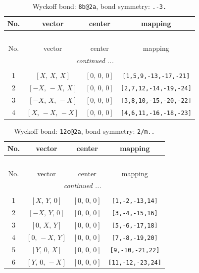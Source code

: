 \documentclass[fleqn,8pt]{jsarticle}
\begin{document}
\begin{longtable}{cccc}
\caption{Wyckoff bond: {\tt 8b@2a}, bond symmetry: {\tt .-3.}}
 \\
 \hline \hline
No. & vector & center & mapping \\ \hline \endfirsthead

\multicolumn{3}{l}{\tablename\ \thetable{}} \\
 \hline \hline
No. & vector & center & mapping \\ \hline \endhead

 \hline \hline
\multicolumn{3}{r}{\footnotesize\it continued ...} \\ \endfoot

 \hline \hline
\multicolumn{3}{r}{} \\ \endlastfoot

1 & $\left[ X,\, X,\, X \right]$ & $\left[ 0,\, 0,\, 0 \right]$ & {\tt [1,5,9,-13,-17,-21]} \\ \hline
2 & $\left[ - X,\, - X,\, X \right]$ & $\left[ 0,\, 0,\, 0 \right]$ & {\tt [2,7,12,-14,-19,-24]} \\ \hline
3 & $\left[ - X,\, X,\, - X \right]$ & $\left[ 0,\, 0,\, 0 \right]$ & {\tt [3,8,10,-15,-20,-22]} \\ \hline
4 & $\left[ X,\, - X,\, - X \right]$ & $\left[ 0,\, 0,\, 0 \right]$ & {\tt [4,6,11,-16,-18,-23]} \\
\end{longtable}
\renewcommand{\arraystretch}{1.2}
\begin{longtable}{cccc}
\caption{Wyckoff bond: {\tt 12c@2a}, bond symmetry: {\tt 2/m..}}
 \\
 \hline \hline
No. & vector & center & mapping \\ \hline \endfirsthead

\multicolumn{3}{l}{\tablename\ \thetable{}} \\
 \hline \hline
No. & vector & center & mapping \\ \hline \endhead

 \hline \hline
\multicolumn{3}{r}{\footnotesize\it continued ...} \\ \endfoot

 \hline \hline
\multicolumn{3}{r}{} \\ \endlastfoot

1 & $\left[ X,\, Y,\, 0 \right]$ & $\left[ 0,\, 0,\, 0 \right]$ & {\tt [1,-2,-13,14]} \\ \hline
2 & $\left[ - X,\, Y,\, 0 \right]$ & $\left[ 0,\, 0,\, 0 \right]$ & {\tt [3,-4,-15,16]} \\ \hline
3 & $\left[ 0,\, X,\, Y \right]$ & $\left[ 0,\, 0,\, 0 \right]$ & {\tt [5,-6,-17,18]} \\ \hline
4 & $\left[ 0,\, - X,\, Y \right]$ & $\left[ 0,\, 0,\, 0 \right]$ & {\tt [7,-8,-19,20]} \\ \hline
5 & $\left[ Y,\, 0,\, X \right]$ & $\left[ 0,\, 0,\, 0 \right]$ & {\tt [9,-10,-21,22]} \\ \hline
6 & $\left[ Y,\, 0,\, - X \right]$ & $\left[ 0,\, 0,\, 0 \right]$ & {\tt [11,-12,-23,24]} \\
\end{longtable}
\end{document}
